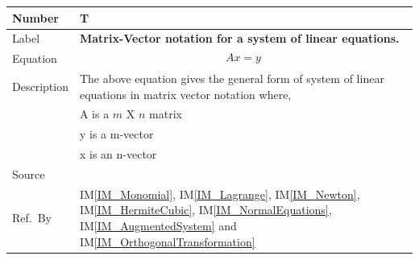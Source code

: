 \documentclass[12pt]{article}
\newcommand{\colAwidth}{0.13\textwidth}
\newcommand{\colBwidth}{0.82\textwidth}
\newcounter{theorynum} %
\newcommand{\iref}[1]{IM\ref{#1}}
\begin{document}

\noindent
\begin{minipage}{\textwidth}
	\renewcommand*{\arraystretch}{1.5}
	\begin{tabular}{| p{\colAwidth} | p{\colBwidth}|}
		\hline
		\rowcolor[gray]{0.9}
		Number& T{theorynum}\thetheorynum \label{T_LinearEqMatrix}\\
		\hline
		Label&\bf Matrix-Vector notation for a system of linear equations.\\
		\hline
		Equation& \begin{equation*}
		Ax = y
		\end{equation*} \\
		\hline
		Description & The above equation gives the general form of system of linear equations in matrix vector notation where,\\
		& A is a $m$ X $n$ matrix\\
		& y is a m-vector\\
		& x is an n-vector\\
		\hline
		Source & ~\cite{Health1997}\\
		
		\hline
		Ref.\ By & \iref{IM_Monomial}, \iref{IM_Lagrange}, \iref{IM_Newton}, \iref{IM_HermiteCubic}, \iref{IM_NormalEquations}, \iref{IM_AugmentedSystem} and \iref{IM_OrthogonalTransformation}\\
		\hline
	\end{tabular}
\end{minipage}\\
~\newline
\end{document}
